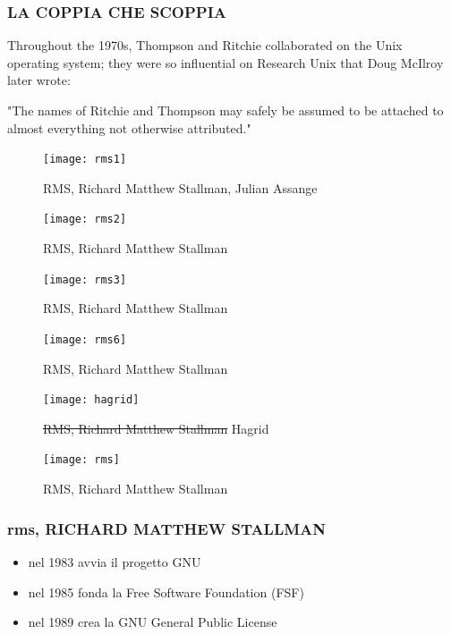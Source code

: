 \documentclass{beamer}
\begin{document}
\begin{frame}
    \frametitle{LA COPPIA CHE SCOPPIA}
    Throughout the 1970s, Thompson and Ritchie collaborated on the Unix operating system; they were so influential on Research Unix that Doug McIlroy later wrote:
    \vspace{5mm}

    \Large{"The names of Ritchie and Thompson may safely be assumed to be attached to almost everything not otherwise attributed."}
\end{frame}
 
\begin{frame}
    \begin{figure}
        \texttt{[image: rms1]}
        \caption{RMS, Richard Matthew Stallman, Julian Assange}
    \end{figure}
\end{frame}
\begin{frame}
    \begin{figure}
        \texttt{[image: rms2]}
        \caption{RMS, Richard Matthew Stallman}
    \end{figure}
\end{frame}
\begin{frame}
    \begin{figure}
        \texttt{[image: rms3]}
        \caption{RMS, Richard Matthew Stallman}
    \end{figure}
\end{frame}
\begin{frame}
    \begin{figure}
        \texttt{[image: rms6]}
        \caption{RMS, Richard Matthew Stallman}
    \end{figure}
\end{frame}
\begin{frame}
    \begin{figure}
        \texttt{[image: hagrid]}
        \caption{\st{RMS, Richard Matthew Stallman} Hagrid}
    \end{figure}
    
\end{frame}
\begin{frame}
    \begin{figure}
        \texttt{[image: rms]}
        \caption{RMS, Richard Matthew Stallman}
    \end{figure}
\end{frame}

\begin{frame}
    \frametitle{rms, RICHARD MATTHEW STALLMAN}
        \begin{itemize}
            \item nel 1983 avvia il progetto GNU
            \item nel 1985 fonda la Free Software Foundation (FSF)
            \item nel 1989 crea la GNU General Public License
        \end{itemize}
\end{frame}
\end{document}
